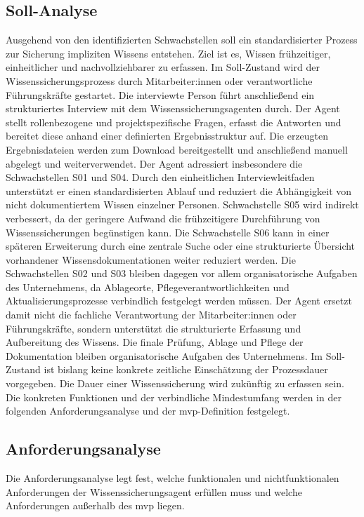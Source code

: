 \documentclass[
  10pt,
  ngerman,
  a4paper,
  toc=graduated,
  numbers=noenddot,
  headings=standardclasses,
  nonumberlist
]{scrartcl}
\begin{document}
\subsection{Soll-Analyse}
\label{soll-analyse}
Ausgehend von den identifizierten Schwachstellen soll ein standardisierter Prozess zur Sicherung impliziten Wissens entstehen. Ziel ist es, Wissen frühzeitiger, einheitlicher und nachvollziehbarer zu erfassen. Im Soll-Zustand wird der Wissenssicherungsprozess durch Mitarbeiter:innen oder verantwortliche Führungskräfte gestartet. Die interviewte Person führt anschließend ein strukturiertes Interview mit dem Wissenssicherungsagenten durch. Der Agent stellt rollenbezogene und projektspezifische Fragen, erfasst die Antworten und bereitet diese anhand einer definierten Ergebnisstruktur auf. Die erzeugten Ergebnisdateien werden zum Download bereitgestellt und anschließend manuell abgelegt und weiterverwendet. Der Agent adressiert insbesondere die Schwachstellen S01 und S04. Durch den einheitlichen Interviewleitfaden unterstützt er einen standardisierten Ablauf und reduziert die Abhängigkeit von nicht dokumentiertem Wissen einzelner Personen. Schwachstelle S05 wird indirekt verbessert, da der geringere Aufwand die frühzeitigere Durchführung von Wissenssicherungen begünstigen kann. Die Schwachstelle S06 kann in einer späteren Erweiterung durch eine zentrale Suche oder eine strukturierte Übersicht vorhandener Wissensdokumentationen weiter reduziert werden. Die Schwachstellen S02 und S03 bleiben dagegen vor allem organisatorische Aufgaben des Unternehmens, da Ablageorte, Pflegeverantwortlichkeiten und Aktualisierungsprozesse verbindlich festgelegt werden müssen. Der Agent ersetzt damit nicht die fachliche Verantwortung der Mitarbeiter:innen oder Führungskräfte, sondern unterstützt die strukturierte Erfassung und Aufbereitung des Wissens. Die finale Prüfung, Ablage und Pflege der Dokumentation bleiben organisatorische Aufgaben des Unternehmens. Im Soll-Zustand ist bislang keine konkrete zeitliche Einschätzung der Prozessdauer vorgegeben. Die Dauer einer Wissenssicherung wird zukünftig zu erfassen sein. Die konkreten Funktionen und der verbindliche Mindestumfang werden in der folgenden Anforderungsanalyse und der \gls{mvp}-Definition festgelegt.

\subsection{Anforderungsanalyse}
\label{anforderungsanalyse}
Die Anforderungsanalyse legt fest, welche funktionalen und nichtfunktionalen Anforderungen der Wissenssicherungsagent erfüllen muss und welche Anforderungen außerhalb des \gls{mvp} liegen.
\end{document}
